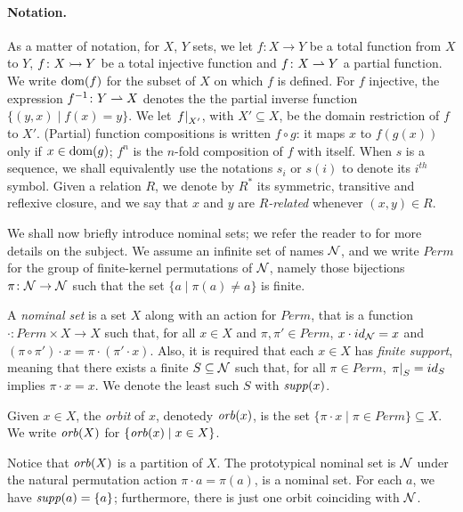 \paragraph{Notation.} As a matter of notation, for $X$, $Y$ sets, we let $f \colon X \to Y$ be a total function from $X$ to $Y$, $f \colon X \rightarrowtail Y$ be a total injective function and $f \colon X \rightharpoonup Y$ a partial function. We write $\operatorname{dom}(f)$ for the subset of $X$ on which $f$ is defined. For $f$ injective, the expression $f^{-1} \colon Y \rightharpoonup X$ denotes the the partial inverse function $\{(y,x) \mid f(x) = y \}$. We let $\left.f\right|_{X'}$, with $X' \subseteq X$, be the domain restriction of $f$ to $X'$. (Partial) function compositions is written $f \circ g$: it maps $x$ to $f(g(x))$ only if $x \in \operatorname{dom}(g)$; $f^n$ is the $n$-fold composition of $f$ with itself. When $s$ is a sequence, we shall equivalently use the notations $s_i$ or $s(i)$ to denote its $i^{\mathit{th}}$ symbol. Given a relation $R$, we denote by $R^*$ its symmetric, transitive and reflexive closure, and we say that $x$ and $y$ are \emph{$R$-related} whenever $(x,y) \in R$.

We shall now briefly introduce nominal sets; we refer the reader to \cite{GabbayPitts?} for more details on the subject. We assume an infinite set of names $\mathcal{N}$, and we write $Perm$ for the group of finite-kernel permutations of $\mathcal{N}$, namely those bijections $\pi \colon \mathcal{N} \to \mathcal{N}$ such that the set $\{ a \mid \pi(a) \neq a \}$ is finite.
\begin{definition}
A \emph{nominal set} is a set $X$ along with an action for $Perm$, that is a function $\cdot \colon Perm \times X \to X$ such that, for all $x \in X$ and $\pi,\pi' \in Perm$, $x \cdot id_{\mathcal{N}} = x$ and $(\pi \circ \pi') \cdot x = \pi \cdot (\pi' \cdot x)$. Also, it is required that each $x \in X$ has \emph{finite support}, meaning that there exists a finite $S \subseteq \mathcal{N}$ such that, for all $\pi \in Perm$, $\left.\pi\right|_{S} = id_S$ implies $\pi \cdot x = x$. We denote the least such $S$ with $\mathit{supp}(x)$.
\end{definition}
%
\begin{definition}
Given $x \in X$, the \emph{orbit} of $x$, denotedy $\mathit{orb}(x) $, is the set $\{ \pi \cdot x \mid \pi \in Perm\} \subseteq X$. We write $\mathit{orb}(X)$ for $\{ \mathit{orb}(x) \mid x \in X\}$. 
\end{definition}

Notice that $\mathit{orb}(X)$ is a partition of $X$. The prototypical nominal set is $\mathcal{N}$ under the natural permutation action $\pi \cdot a = \pi(a)$, is a nominal set. For each $a$, we have $\mathit{supp}(a) = \{a\}$; furthermore, there is just one orbit coinciding with $\mathcal{N}$.
